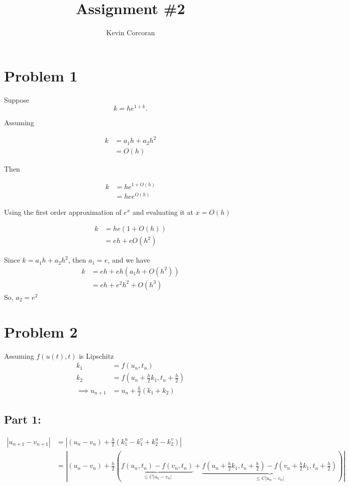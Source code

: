 \documentclass[12pt,a4paper]{article}
\title{ Assignment \#2 }
\author{ Kevin Corcoran }
\begin{document}
\maketitle


\section{Problem 1}
Suppose
\[
k = he^{1+k}
.\] 

Assuming

\begin{align*}
  k &= a_1h + a_2h^2 \\
    &= O(h)
\end{align*}

Then

\begin{align*}
  k &= he^{1+O(h)} \\
    &= hee^{O(h)}
\end{align*}

Using the first order approximation of $e^{x}$ and evaluating it at $x=O(h)$

\begin{align*}
  k &= he(1+O(h)) \\
    &= eh + eO(h^2)
\end{align*}

Since $k = a_1h + a_2h^2$, then $\boxed{a_1 = e}$, and we have
\begin{align*}
  k &= eh+eh(a_1h+O(h^2))\\
    &=eh+e^2h^2+O(h^3)
\end{align*}
So, $\boxed{a_2=e^2}$


\section{Problem 2}

Assuming $f(u(t),t)$ is Lipschitz
\begin{align*}
  k_1 &= f(u_n,t_n)\\
  k_2 &= f(u_n+ \frac{h}{2}k_1, t_n + \frac{h}{2}) \\
  \implies u_{n+1} &= u_n + \frac{h}{2}(k_1 + k_2)
\end{align*}
\subsection{Part 1:}
\begin{align*}
  |u_{n+1}-v_{n+1}| &= |(u_n - v_n)+ \frac{h}{2} \left(k_1^u -k_1^v + k_2^u - k_2^v\right)|\\
                    &= |(u_n-v_n) + \frac{h}{2} \left(\underbrace{f(u_n,t_n)-
                        f(v_n,t_n)}_{\leq C |u_n -v_n|} + \underbrace{f(u_n+
                      \frac{h}{2}k_1, t_n + \frac{h}{2}) - f(v_n+
                  \frac{h}{2}k_1, t_n + \frac{h}{2})}_{\leq C|u_n-v_n|}  \right) |
\end{align*}
\end{document}
